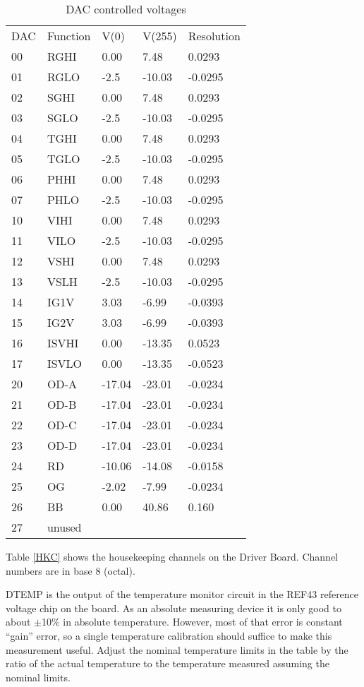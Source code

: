 \begin{table}[h]
\centering
\begin{tabular}{|l|l|l|l|l|}
\hline
DAC & Function & V(0) & V(255) & Resolution \\
00 & RGHI & 0.00 & 7.48 & 0.0293 \\
01 & RGLO & -2.5 & -10.03 & -0.0295 \\
02 & SGHI & 0.00 & 7.48 & 0.0293 \\
03 & SGLO & -2.5 & -10.03 & -0.0295 \\
04 & TGHI & 0.00 & 7.48 & 0.0293 \\
05 & TGLO & -2.5 & -10.03 & -0.0295 \\
06 & PHHI & 0.00 & 7.48 & 0.0293 \\
07 & PHLO & -2.5 & -10.03 & -0.0295 \\
10 & VIHI & 0.00 & 7.48 & 0.0293 \\
11 & VILO & -2.5 & -10.03 & -0.0295 \\
12 & VSHI & 0.00 & 7.48 & 0.0293 \\
13 & VSLH & -2.5 & -10.03 & -0.0295 \\
14 & IG1V & 3.03 & -6.99 & -0.0393 \\
15 & IG2V & 3.03 & -6.99 & -0.0393 \\
16 & ISVHI & 0.00 & -13.35 & 0.0523 \\
17 & ISVLO & 0.00 & -13.35 & -0.0523 \\
20 & OD-A & -17.04 & -23.01 & -0.0234 \\
21 & OD-B & -17.04 & -23.01 & -0.0234 \\
22 & OD-C & -17.04 & -23.01 & -0.0234 \\
23 & OD-D & -17.04 & -23.01 & -0.0234 \\
24 & RD & -10.06 & -14.08 & -0.0158 \\
25 & OG & -2.02 & -7.99 & -0.0234 \\
26 & BB & 0.00 & 40.86 & 0.160 \\
27 & unused & & & \\
\hline
\end{tabular}
\caption{DAC controlled voltages}
\label{DACV}
\end{table}

Table \ref{HKC} shows the housekeeping channels on the Driver Board. Channel numbers are in base 8 (octal). 

DTEMP is the output of the temperature monitor circuit in the REF43 reference voltage chip on the board. As an absolute measuring device it is only good to about $\pm$10\% in absolute temperature. However, most of that error is constant ``gain'' error, so a single temperature calibration should suffice to make this measurement useful. Adjust the nominal temperature limits in the table by the ratio of the actual temperature to the temperature measured assuming the nominal limits.

